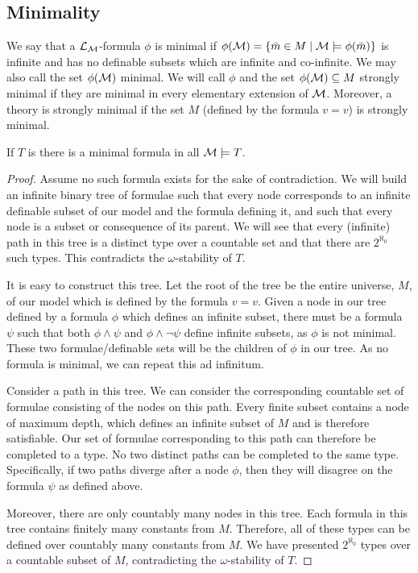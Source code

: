 \subsection{Minimality}

\begin{definition}\label{definition_minimality}
We say that a \(\mathcal{L}_{\mathcal{M}}\)-formula \(\phi\) is minimal if \(\phi(\mathcal{M}) = \{\bar{m} \in M \mid \mathcal{M} \models \phi(\bar{m})\}\) is infinite and has no definable subsets which are infinite and co-infinite. 
We may also call the set \(\phi(\mathcal{M})\) minimal. 
We will call \(\phi\) and the set \(\phi(\mathcal{M}) \subseteq M\) strongly minimal if they are minimal in every elementary extension of \(\mathcal{M}\).
Moreover, a theory is strongly minimal if the set \(M\) (defined by the formula \(v = v\)) is strongly minimal. 
\end{definition}

\begin{lemma}\label{lemma_minimal_omst}
If \(T\) is \omst there is a minimal formula in all \(\mathcal{M} \models T\).
\end{lemma}

\begin{proof}
Assume no such formula exists for the sake of contradiction. 
We will build an infinite binary tree of formulae such that 
every node corresponds to an infinite definable subset of our model and the formula defining it, 
and such that every node is a subset or consequence of its parent. 
We will see that every (infinite) path in this tree is a distinct type over a countable set and that there are \(2^{\aleph_0}\) such types. 
This contradicts the \(\omega\)-stability of \(T\).

It is easy to construct this tree. Let the root of the tree be the entire universe, \(M\), of our model which is defined by the formula \(v = v\).
Given a node in our tree defined by a formula \(\phi\) which defines an infinite subset, there must be a formula \(\psi\) such that both \(\phi \land \psi\) and \(\phi \land \neg \psi\) define infinite subsets, as \(\phi\) is not minimal. 
These two formulae/definable sets will be the children of \(\phi\) in our tree. 
As no formula is minimal, we can repeat this ad infinitum. 

Consider a path in this tree. We can consider the corresponding countable set of formulae consisting of the nodes on this path. 
Every finite subset contains a node of maximum depth, which defines an infinite subset of \(M\) and is therefore satisfiable. 
Our set of formulae corresponding to this path can therefore be completed to a type.
No two distinct paths can be completed to the same type. 
Specifically, if two paths diverge after a node \(\phi\), then they will disagree on the formula \(\psi\) as defined above. 

Moreover, there are only countably many nodes in this tree. 
Each formula in this tree contains finitely many constants from \(M\).
Therefore, all of these types can be defined over countably many constants from \(M\). 
We have presented \(2^{\aleph_0}\) types over a countable subset of \(M\), contradicting the \(\omega\)-stability of \(T\).
\end{proof}

